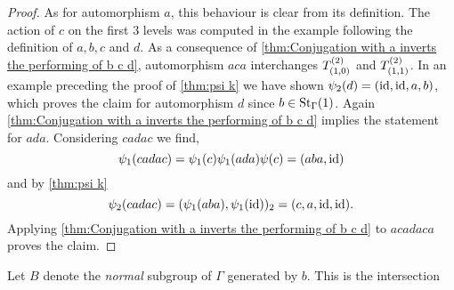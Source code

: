 \begin{proof}
As for automorphism $a$, this behaviour is clear from its definition. The action of $c$ on the first 3 levels was computed in the example following the definition of $a,b,c$ and $d$. As a consequence of \cref{thm:Conjugation with a inverts the performing of b c d}, automorphism $aca$ interchanges $\ST{(1,0)}$ and $\ST{(1,1)}$. In an example preceding the proof of \cref{thm:psi k} we have shown $\psi_2(d)=(\id,\id,a,b)$, which proves the claim for automorphism $d$ since $b\in\St[\Gamma]{1}$. Again \cref{thm:Conjugation with a inverts the performing of b c d} implies the statement for $ada$. Considering $cadac$ we find,
\begin{equation*}
\psi_1(cadac)=\psi_1(c)\psi_1(ada)\psi(c)=(aba,\id)
\end{equation*}
and by \cref{thm:psi k}
\begin{equation*}
\psi_2(cadac)=(\psi_1(aba),\psi_1(\id))_2=(c,a,\id,\id).
\end{equation*}
Applying \cref{thm:Conjugation with a inverts the performing of b c d} to $acadaca$ proves the claim.
\end{proof}
Let $B$ denote the \emph{normal} subgroup of $\Gamma$ generated by $b$. This is the intersection
